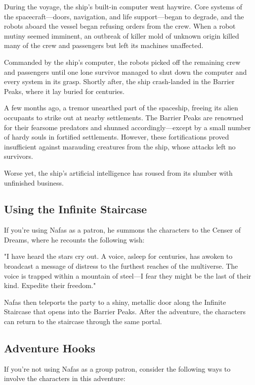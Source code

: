 \documentclass[10pt,a4paper,twoside,bg=print,twocolumn,openany,nodeprecatedcode]{dndbook}
\begin{document}
During the voyage, the ship's built-in computer went haywire. Core systems of the spacecraft—doors, navigation, and life support—began to degrade, and the robots aboard the vessel began refusing orders from the crew. When a robot mutiny seemed imminent, an outbreak of killer mold of unknown origin killed many of the crew and passengers but left its machines unaffected.

Commanded by the ship's computer, the robots picked off the remaining crew and passengers until one lone survivor managed to shut down the computer and every system in its grasp. Shortly after, the ship crash-landed in the Barrier Peaks, where it lay buried for centuries.

A few months ago, a tremor unearthed part of the spaceship, freeing its alien occupants to strike out at nearby settlements. The Barrier Peaks are renowned for their fearsome predators and shunned accordingly—except by a small number of hardy souls in fortified settlements. However, these fortifications proved insufficient against marauding creatures from the ship, whose attacks left no survivors.

Worse yet, the ship's artificial intelligence has roused from its slumber with unfinished business.

\subsection{Using the Infinite Staircase}
If you're using Nafas as a patron, he summons the characters to the Censer of Dreams, where he recounts the following wish:

\begin{DndReadAloud}{}
"I have heard the stars cry out. A voice, asleep for centuries, has awoken to broadcast a message of distress to the furthest reaches of the multiverse. The voice is trapped within a mountain of steel—I fear they might be the last of their kind. Expedite their freedom."

\end{DndReadAloud}

Nafas then teleports the party to a shiny, metallic door along the Infinite Staircase that opens into the Barrier Peaks. After the adventure, the characters can return to the staircase through the same portal.

\subsection{Adventure Hooks}
If you're not using Nafas as a group patron, consider the following ways to involve the characters in this adventure:
\end{document}
